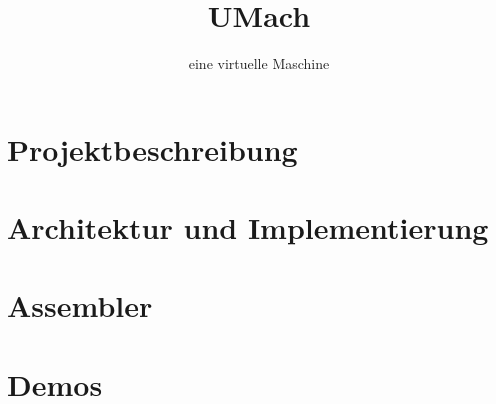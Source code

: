 \documentclass{beamer}
\title{UMach}
\subtitle{eine virtuelle Maschine}
\author{}
\institute{Georg-Simon-Ohm-Hochschule}
\date{}
\begin{document}
\frame{\titlepage}



\part{Projektbeschreibung}


\part{Architektur und Implementierung}


\part{Assembler}


%

\part{Demos}

\end{document}
